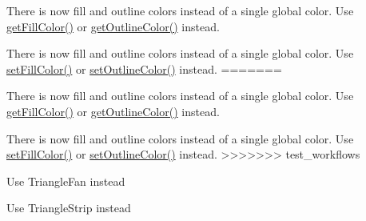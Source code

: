 \begin{DoxyRefList}
There is now fill and outline colors instead of a single global color. Use \mbox{\hyperlink{classsf_1_1Text_a10400757492ec7fa97454488314ca39b}{get\+Fill\+Color()}} or \mbox{\hyperlink{classsf_1_1Text_ade9256ff9d43c9481fcf5f4003fe0141}{get\+Outline\+Color()}} instead. 
\item[Member \mbox{\hyperlink{classsf_1_1Text_afd1742fca1adb6b0ea98357250ffb634}{sf\+::Text\+::set\+Color}} (const \mbox{\hyperlink{classsf_1_1Color}{Color}} \&color)]\label{deprecated__deprecated000021}%
%
There is now fill and outline colors instead of a single global color. Use \mbox{\hyperlink{classsf_1_1Text_ab7bb3babac5a6da1802b2c3e1a3e6dcc}{set\+Fill\+Color()}} or \mbox{\hyperlink{classsf_1_1Text_aa19ec69c3b894e963602a6804ca68fe4}{set\+Outline\+Color()}} instead. 
=======
\item[Member \mbox{\hyperlink{classsf_1_1Text_a4a9c8192b380ff9eaf3dd46b0d7cde26}{sf\+::Text\+::get\+Color}} () const]\label{deprecated__deprecated000022}%
%
There is now fill and outline colors instead of a single global color. Use \mbox{\hyperlink{classsf_1_1Text_a1b5cfb1eb66599301b63c91f58d70ea9}{get\+Fill\+Color()}} or \mbox{\hyperlink{classsf_1_1Text_acd135485f04dd390aa2cc0969324d836}{get\+Outline\+Color()}} instead. 
\item[Member \mbox{\hyperlink{classsf_1_1Text_a6f2eceadf5f99ce82eca680514353dd5}{sf\+::Text\+::set\+Color}} (const \mbox{\hyperlink{classsf_1_1Color}{Color}} \&color)]\label{deprecated__deprecated000021}%
%
There is now fill and outline colors instead of a single global color. Use \mbox{\hyperlink{classsf_1_1Text_af468500b5c719b8dd06bab6396bd154d}{set\+Fill\+Color()}} or \mbox{\hyperlink{classsf_1_1Text_a14f20e947b86b8ee3ea315ad93edb6f1}{set\+Outline\+Color()}} instead. 
>>>>>>> test_workflows
\item[Member \mbox{\hyperlink{group__graphics_gga5ee56ac1339984909610713096283b1ba5338a2c6d922151fe50f235036af8a20}{sf\+::Triangles\+Fan}} ]\label{deprecated__deprecated000008}%
%
Use Triangle\+Fan instead  
\item[Member \mbox{\hyperlink{group__graphics_gga5ee56ac1339984909610713096283b1ba66643dbbb24bbacb405973ed80eebae0}{sf\+::Triangles\+Strip}} ]\label{deprecated__deprecated000007}%
%
Use Triangle\+Strip instead 
\end{DoxyRefList}